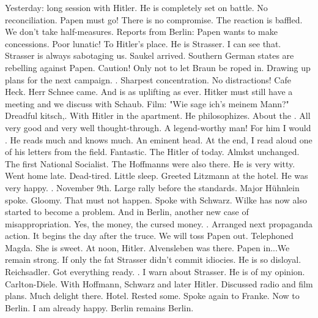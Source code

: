 
Yesterday: long session with Hitler. He is completely set on battle. No reconciliation.  Papen must go! There is no compromise. The reaction is baffled. We don't take half-measures. Reports from Berlin: Papen wants to make concessions. Poor lunatic! To Hitler's place. He is  Strasser. I can see that. Strasser is always sabotaging us. Saukel arrived. Southern German states are rebelling against Papen. Caution! Only not to let Braun be roped in. Drawing up plans for the next campaign. . Sharpest concentration. No distractions! Cafe Heck. Herr Schnee came. And is as uplifting as ever. Hitker must still have a meeting and we discuss with Schaub. Film: "Wie sage ich's meinem Mann?" Dreadful kitsch,. With Hitler in the apartment. He philosophizes. About the . All very good and very well thought-through. A legend-worthy man! For him I would . He reads much and knows much. An eminent head. At the end, I read aloud one of his letters from the field. Fantastic. The Hitler of today. Almkst unchanged. The first National Socialist. The Hoffmanns were also there. He is very witty. Went home late. Dead-tired. Little sleep. Greeted Litzmann at the hotel. He was very happy. . November 9th.  Large rally before the standards. Major Hühnlein spoke. Gloomy. That must not happen. Spoke with Schwarz. Wilke has now also started to become a problem. And in Berlin, another new case of misappropriation. Yes, the money, the cursed money.  . Arranged next propaganda action. It begins the day after the truce. We will toss Papen out. Telephoned Magda. She is sweet. At noon, Hitler. Alvensleben was there. Papen in...We remain strong. If only the fat Strasser didn't commit idiocies. He is so disloyal. Reichsadler. Got everything ready. . I warn about Strasser. He is of my opinion. Carlton-Diele. With Hoffmann, Schwarz and later Hitler. Discussed radio and film plans. Much delight there. Hotel. Rested some. Spoke again to Franke. Now to Berlin. I am already happy. Berlin remains Berlin.

